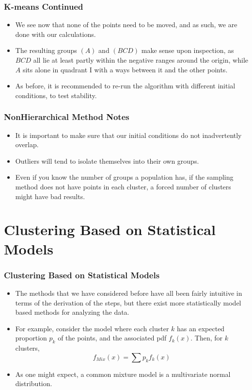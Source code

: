 \documentclass{beamer}
\begin{document}
\begin{frame}
\frametitle{K-means Continued}
\begin{itemize}
\item We see now that none of the points need to be moved, and as such, we are done with our calculations.
\item The resulting groups $(A)$ and $(BCD)$ make sense upon inspection, as $BCD$ all lie at least partly within the negative ranges around the origin, while $A$ sits alone in quadrant I with a ways between it and the other points.
\item As before, it is recommended to re-run the algorithm with different initial conditions, to test stability.
\end{itemize}
\end{frame}

\begin{frame}
\frametitle{NonHierarchical Method Notes}
\begin{itemize}
\item It is important to make sure that our initial conditions do not inadvertently overlap.
\pause
\item Outliers will tend to isolate themselves into their own groups.
\pause
\item Even if you know the number of groups a population has, if the sampling method does not have points in each cluster, a forced number of clusters might have bad results.
\end{itemize}
\end{frame}

\section{Clustering Based on Statistical Models}
\begin{frame}
\frametitle{Clustering Based on Statistical Models}
\begin{itemize}
\item The methods that we have considered before have all been fairly intuitive in terms of the derivation of the steps, but there exist more statistically model based methods for analyzing the data.
\item For example, consider the model where each cluster $k$ has an expected proportion $p_k$ of the points, and the associated pdf $f_k(x)$. Then, for $k$ clusters,
\[f_{Mix}(x)=\sum p_kf_k(x)\]
\item As one might expect, a common mixture model is a multivariate normal distribution.
\end{itemize}
\end{frame}
\end{document}
